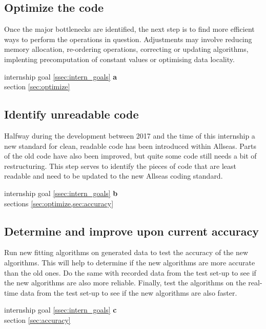 \subsection{Optimize the code} \label{ssec:optimize_code}
Once the major bottlenecks are identified, the next step is to find more efficient ways to perform the operations in question. Adjustments
may involve reducing memory allocation, re-ordering operations, correcting or updating algorithms, implenting precomputation of constant values
or optimising data locality.
\begin{flushright}
     internship goal \ref{ssec:intern_goals} \textbf{a}\\
    \large{} section \ref{sec:optimize}
\end{flushright}

\subsection{Identify unreadable code} \label{ssec:unreadable_code}
Halfway during the development between 2017 and the time of this internship a new standard for clean, readable code has been
introduced within Allseas. Parts of the old code have also been improved, but quite some code still needs a bit of restructuring.
This step serves to identify the pieces of code that are least readable and need to be updated to the new Allseas coding standard.
\begin{flushright}
     internship goal \ref{ssec:intern_goals} \textbf{b}\\
    \large{} sections \cref{sec:optimize,sec:accuracy}
\end{flushright}

\subsection{Determine and improve upon current accuracy} \label{ssec:test_accuracy}
Run new fitting algorithms on generated data to test the accuracy of the new algorithms.
This will help to determine if the new algorithms are more accurate than the old ones. Do the same
with recorded data from the test set-up to see if the new algorithms are also more reliable. Finally,
test the algorithms on the real-time data from the test set-up to see if the new algorithms are also faster.
\begin{flushright}
     internship goal \ref{ssec:intern_goals} \textbf{c}\\
    \large{} section \ref{sec:accuracy}
\end{flushright}

